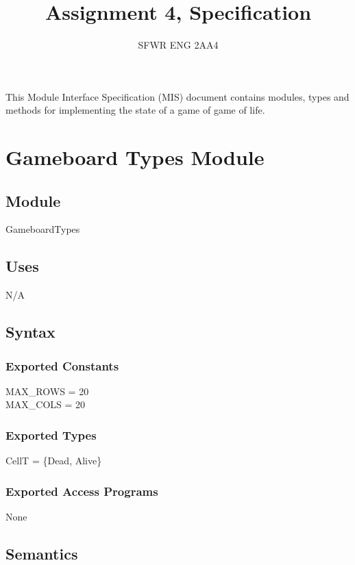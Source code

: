 \documentclass[12pt]{article}
\title{Assignment 4, Specification}
\author{SFWR ENG 2AA4}
\begin{document}
\maketitle
This Module Interface Specification (MIS) document contains modules, types and
methods for implementing the state of a game of game of life.

\newpage

\section* {Gameboard Types Module}

\subsection*{Module}

GameboardTypes

\subsection* {Uses}

N/A

\subsection* {Syntax}

\subsubsection* {Exported Constants}

MAX\_ROWS = 20\\
MAX\_COLS = 20\\

\subsubsection* {Exported Types}

CellT = \{Dead, Alive\}\\ 

\subsubsection* {Exported Access Programs}

None

\subsection* {Semantics}
\end{document}
